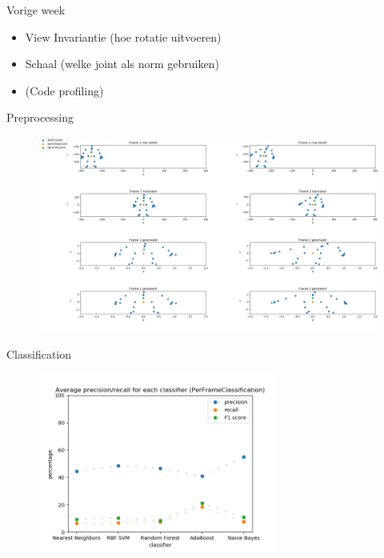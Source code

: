 \documentclass[]{beamer}
\begin{document}
	
	\begin{frame}{Vorige week}
		\begin{itemize}
			\item View Invariantie (hoe rotatie uitvoeren)
			\item Schaal (welke joint als norm gebruiken)
			\item (Code profiling)
		\end{itemize}
	\end{frame}
	\begin{frame}{Preprocessing}
			\begin{figure}
				\includegraphics[width=\textwidth]{skeleton_preprocessing}
			\end{figure}
	\end{frame}
	\begin{frame}{Classification}
		\begin{figure}
			\includegraphics[width=0.7\textwidth]{PerFrameClassification}
		\end{figure} 
	\end{frame}
\end{document}
